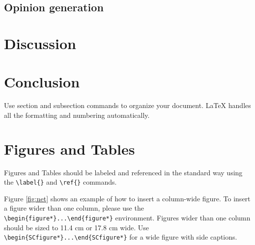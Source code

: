 \documentclass[9pt,twocolumn,twoside]{ilcss}
\begin{document}
\subsection{Opinion generation}

\section{Discussion}

\section{Conclusion}







Use section and subsection commands to organize your document. \LaTeX{} handles all the formatting and numbering automatically. 

\section{Figures and Tables}

Figures and Tables should be labeled and referenced in the standard way using the \verb|\label{}| and \verb|\ref{}| commands.




Figure \ref{fig:net} shows an example of how to insert a column-wide figure. To insert a figure wider than one column, please use the \verb|\begin{figure*}...\end{figure*}| environment. Figures wider than one column should be sized to 11.4 cm or 17.8 cm wide. Use \verb|\begin{SCfigure*}...\end{SCfigure*}| for a wide figure with side captions.
\end{document}

